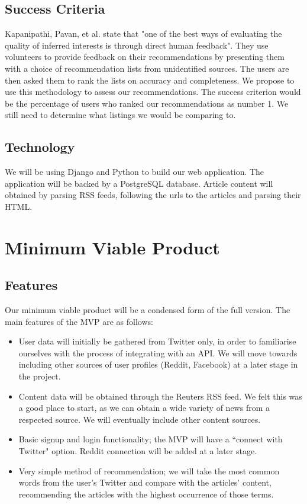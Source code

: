 \documentclass[11pt]{article}
\begin{document}
\subsection{Success Criteria}
Kapanipathi, Pavan, et al.\cite{who_likes_what} state that "one of the best ways of evaluating the quality of inferred interests is through direct human feedback". They use volunteers to provide feedback on their recommendations by presenting them with a choice of recommendation lists from unidentified sources. The users are then asked them to rank the lists on accuracy and completeness. We propose to use this methodology to assess our recommendations. The success criterion would be the percentage of users who ranked our recommendations as number 1. We still need to determine what listings we would be comparing to.

\subsection{Technology}

We will be using Django and Python to build our web application. The application will be backed by a PostgreSQL database. Article content will obtained by parsing RSS feeds, following the urls to the articles and parsing their HTML. 

\section{Minimum Viable Product}

\subsection{Features} 
Our minimum viable product will be a condensed form of the full version. The main features of the MVP are as follows:

\begin{itemize}
\item User data will initially be gathered from Twitter only, in order to familiarise ourselves with the process of integrating with an API. We will move towards including other sources of user profiles (Reddit, Facebook) at a later stage in the project.

\item Content data will be obtained through the Reuters RSS feed. We felt this was a good place to start, as we can obtain a wide variety of news from a respected source. We will eventually include other content sources.

\item Basic signup and login functionality; the MVP will have a ``connect with Twitter" option. Reddit connection will be added at a later stage.

\item Very simple method of recommendation; we will take the most common words from the user's Twitter and compare with the articles' content, recommending the articles with the highest occurrence of those terms.

\end{itemize}
\end{document}
